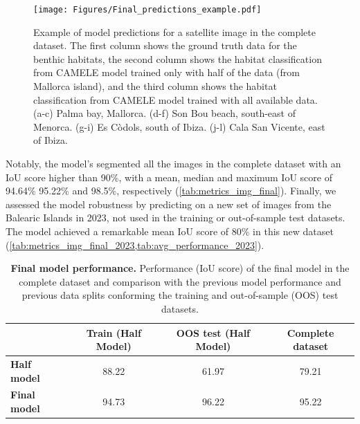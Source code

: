 \begin{figure}[H]
    \centering
    \texttt{[image: Figures/Final\_predictions\_example.pdf]}
    \caption[Example of model predictions for a satellite image in the complete
        dataset]{Example of model predictions for a satellite image in the
        complete
        dataset. The first column shows the ground truth data for the benthic
        habitats, the second column shows the habitat classification from
        CAMELE model trained only with half of the data (from Mallorca island),
        and the third column shows the habitat classification from CAMELE model
        trained with all available data. (a-c) Palma bay, Mallorca. (d-f) Son
        Bou beach, south-east of Menorca. (g-i) Es Còdols, south of Ibiza.
        (j-l) Cala San Vicente, east of Ibiza.}
    \label{fig:model_performance_complete}
\end{figure}

Notably, the model's
segmented all the images in the complete dataset with an IoU score higher than
90\%, with a mean, median and maximum IoU score of 94.64\% 95.22\% and 98.5\%,
respectively (\cref{tab:metrics_img_final}). Finally, we assessed the model
robustness by predicting on a new set of images from the Balearic Islands in
2023, not used in the training or out-of-sample test datasets. The model
achieved a remarkable mean IoU score of 80\% in this new dataset
(\cref{tab:metrics_img_final_2023,tab:avg_performance_2023}).

\begin{table}[H]
    \centering
    \caption[Final model performance]{\textbf{Final model performance.}
        Performance (IoU score) of the final model in the complete dataset
        and
        comparison with the previous model performance and previous data splits
        conforming the training and out-of-sample (OOS) test datasets.}
    \label{tab:my-table}
    \begin{tabular}{lccc}
        \hline
                                       & \textbf{Train (Half Model)}
                                       &
        \textbf{OOS test (Half Model)} &
        \textbf{Complete
            dataset}
        \\
        \hline
        \textbf{Half model}            & 88.22
                                       & 61.97                       &
        79.21
        \\
        \textbf{Final model}           & 94.73
                                       & 96.22                       &
        95.22
        \\\hline
    \end{tabular}
\end{table}

